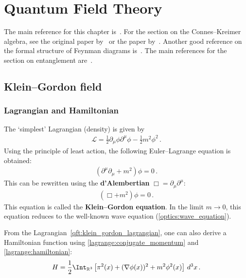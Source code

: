 \chapter{Quantum Field Theory}

    The main reference for this chapter is~\citet{peskin_introduction_1995}. For the section on the Connes--Kreimer algebra, see the original paper by~\citet{connes_hopf_1998} or the paper by~\citet{ebrahimi-fard_hopf_2005}. Another good reference on the formal structure of Feynman diagrams is~\citet{yeats_combinatorial_2017}. The main references for the section on entanglement are~\citet{tuybens_entanglement_2017,rangamani_holographic_2017}.

\section{Klein--Gordon field}
\subsection{Lagrangian and Hamiltonian}

    The `simplest' Lagrangian (density) is given by
    \begin{gather}
        \label{qft:klein_gordon_lagrangian}
        \mathcal{L} = \frac{1}{2}\partial_\mu\phi\partial^\mu\phi - \frac{1}{2}m^2\phi^2\,.
    \end{gather}
    Using the principle of least action, the following Euler--Lagrange equation is obtained:
    \begin{gather}
        \left(\partial^\mu\partial_\mu + m^2\right)\phi = 0\,.
    \end{gather}
    This can be rewritten using the \textbf{d'Alembertian} $\Box = \partial_\mu\partial^\mu$:
    \begin{gather}
        \label{qft:klein_gordon_equation}
        (\Box+m^2)\phi = 0\,.
    \end{gather}
    This equation is called the \textbf{Klein--Gordon equation}. In the limit $m\longrightarrow0$, this equation reduces to the well-known wave equation (\cref{optics:wave_equation}).

    From the Lagrangian~\eqref{qft:klein_gordon_lagrangian}, one can also derive a Hamiltonian function using \cref{lagrange:conjugate_momentum} and \cref{lagrange:hamiltonian}:
    \begin{gather}
        \label{qft:klein_gordon_hamiltonian}
        H = \frac{1}{2}\Int_{\mathbb{R}^3}\left[\pi^2(x) + (\nabla\phi(x))^2 + m^2\phi^2(x)\right]\,d^3x\,.
    \end{gather}

